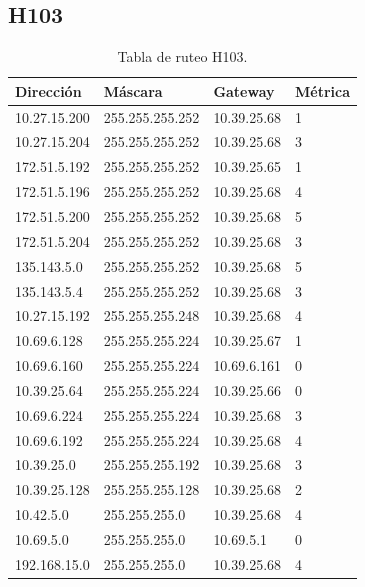 \documentclass[12pt,titlepage]{article}
\begin{document}
\subsection{H103}
\begin{table}
  \begin{center}
    \begin{tabular}{|l|l|l|l|}
      \hline
        \bf{Direcci\'on} & \bf{M\'ascara} & \bf{Gateway} & \bf{M\'etrica} \\
      \hline 
	10.27.15.200  & 255.255.255.252 & 10.39.25.68 & 1 \\
        10.27.15.204  & 255.255.255.252 & 10.39.25.68 & 3 \\
        172.51.5.192  & 255.255.255.252 & 10.39.25.65 & 1 \\
        172.51.5.196  & 255.255.255.252 & 10.39.25.68 & 4 \\
        172.51.5.200  & 255.255.255.252 & 10.39.25.68 & 5 \\
        172.51.5.204  & 255.255.255.252 & 10.39.25.68 & 3 \\
        135.143.5.0   & 255.255.255.252 & 10.39.25.68 & 5 \\
        135.143.5.4   & 255.255.255.252 & 10.39.25.68 & 3 \\ 	
	10.27.15.192  & 255.255.255.248 & 10.39.25.68 & 4 \\
	10.69.6.128   & 255.255.255.224 & 10.39.25.67 & 1 \\
        10.69.6.160   & 255.255.255.224 & 10.69.6.161 & 0 \\
	10.39.25.64   & 255.255.255.224 & 10.39.25.66 & 0 \\       
	10.69.6.224   & 255.255.255.224 & 10.39.25.68 & 3 \\
	10.69.6.192   & 255.255.255.224 & 10.39.25.68 & 4 \\	
	10.39.25.0    & 255.255.255.192 & 10.39.25.68 & 3 \\
	10.39.25.128  & 255.255.255.128 & 10.39.25.68 & 2 \\
	10.42.5.0     & 255.255.255.0 & 10.39.25.68 & 4 \\
        10.69.5.0     & 255.255.255.0 & 10.69.5.1 & 0 \\
        192.168.15.0  & 255.255.255.0 & 10.39.25.68 & 4 \\  
    \hline
    \end{tabular} \\
  \end{center}
  \caption{Tabla de ruteo H103.}
\end{table}
\newpage
\end{document}
